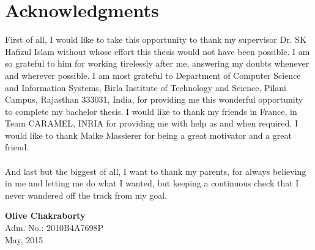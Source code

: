 \documentclass[a4paper,12pt]{report}
\begin{document}
\chapter*{Acknowledgments}
First of all, I would like to take this opportunity to thank my
supervisor Dr. SK Hafizul Islam without whose effort this thesis
would not have been possible. I am so grateful to him for working
tirelessly after me, answering my doubts whenever and wherever
possible. I am most grateful to Department of Computer Science and
Information Systems, Birla Institute of Technology and Science,
Pilani Campus, Rajasthan 333031, India, for providing me this
wonderful opportunity to complete my bachelor thesis. I would like
to thank my friends in France, in Team CARAMEL, INRIA for providing
me with help as and when required. I would like to thank Maike
Massierer for being a great motivator and a great friend.\\
\\
\linebreak And last but the biggest of all, I want to thank my
parents, for always believing in me and letting me do what I wanted,
but keeping a continuous
check that I never wandered off the track from my goal.\\


\bigskip
\bigskip
\bigskip
\bigskip
\begin{flushleft}
\bigskip
\textbf{Olive Chakraborty}\\
\smallskip
 Adm. No.: 2010B4A7698P\\
 May, 2015\\
\end{flushleft}


\newpage
\end{document}
